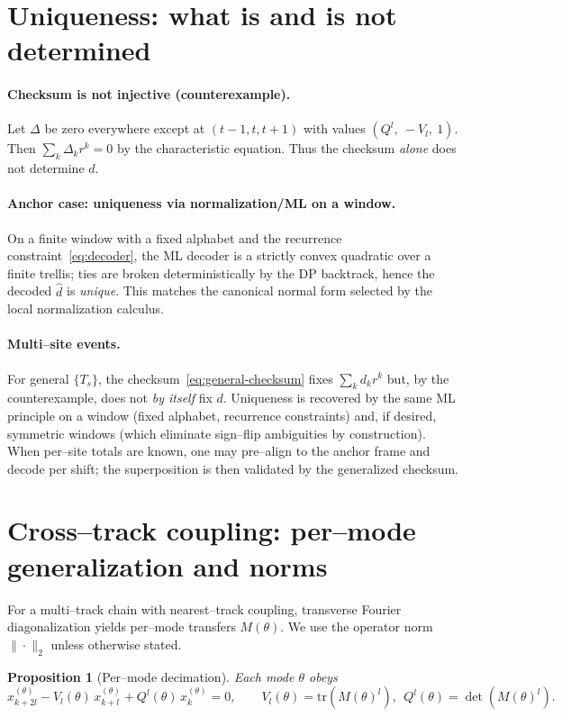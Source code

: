 \documentclass[11pt]{article}
\newtheorem{proposition}[theorem]{Proposition}
\theoremstyle{definition}
\theoremstyle{remark}
\newcommand{\tr}{\mathrm{tr}}
\begin{document}
\section{Uniqueness: what is and is not determined}\label{sec:uniqueness}
\paragraph{Checksum is not injective (counterexample).}
Let $\Delta$ be zero everywhere except at $(t{-}1,t,t{+}1)$ with values $(Q^l,\ -V_l,\ 1)$.
Then $\sum_k \Delta_k r^k=0$ by the characteristic equation. Thus the checksum \emph{alone} does not determine $d$.

\paragraph{Anchor case: uniqueness via normalization/ML on a window.}
On a finite window with a fixed alphabet and the recurrence constraint~\eqref{eq:decoder}, the ML decoder is a strictly convex quadratic over a finite trellis;
ties are broken deterministically by the DP backtrack, hence the decoded $\hat d$ is \emph{unique}.
This matches the canonical normal form selected by the local normalization calculus.

\paragraph{Multi--site events.}
For general $\{T_s\}$, the checksum~\eqref{eq:general-checksum} fixes $\sum_k d_k r^k$ but, by the counterexample, does not \emph{by itself} fix $d$.
Uniqueness is recovered by the same ML principle on a window (fixed alphabet, recurrence constraints) and, if desired, symmetric windows (which eliminate sign--flip ambiguities by construction).
When per--site totals are known, one may pre--align to the anchor frame and decode per shift; the superposition is then validated by the generalized checksum.

\section{Cross--track coupling: per--mode generalization and norms}
For a multi--track chain with nearest--track coupling, transverse Fourier diagonalization yields per--mode transfers $M(\theta)$.
We use the operator norm $\|\cdot\|_2$ unless otherwise stated.
\begin{proposition}[Per--mode decimation]\label{prop:modal}
Each mode $\theta$ obeys
\begin{equation}\label{eq:mode}
x^{(\theta)}_{k+2l} - V_l(\theta)\,x^{(\theta)}_{k+l} + Q^l(\theta)\,x^{(\theta)}_k=0,\qquad
V_l(\theta)=\tr(M(\theta)^l),\ \ Q^l(\theta)=\det(M(\theta)^l).
\end{equation}
\end{proposition}
\end{document}
